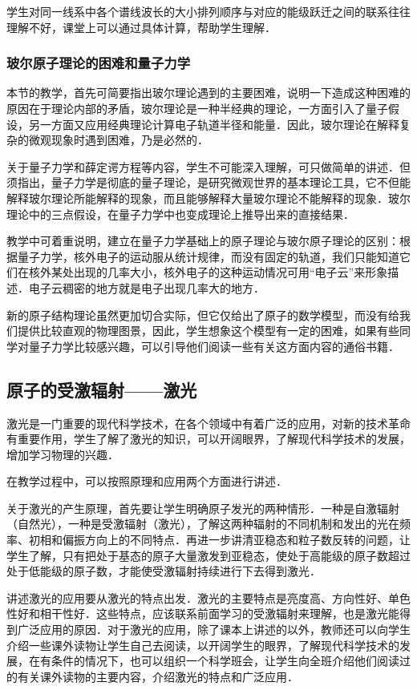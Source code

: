 学生对同一线系中各个谱线波长的大小排列顺序与对应的能级跃迁之间的联系往往理解不好，课堂上可以通过具体计算，帮助学生理解．

\subsubsection{玻尔原子理论的困难和量子力学}

本节的教学，首先可简要指出玻尔理论遇到的主要困难，说明一下造成这种困难的原因在于理论内部的矛盾，玻尔理论是一种半经典的理论，一方面引入了量子假设，另一方面又应用经典理论计算电子轨道半径和能量．因此，玻尔理论在解释复杂的微观现象时遇到困难，乃是必然的．

关于量子力学和薛定谔方程等内容，学生不可能深入理解，可只做简单的讲述．但须指出，量子力学是彻底的量子理论，是研究微观世界的基本理论工具，它不但能解释玻尔理论所能解释的现象，而且能够解释大量玻尔理论不能解释的现象．玻尔理论中的三点假设，在量子力学中也变成理论上推导出来的直接结果．

教学中可着重说明，建立在量子力学基础上的原子理论与玻尔原子理论的区别：根据量子力学，核外电子的运动服从统计规律，而没有固定的轨道，我们只能知道它们在核外某处出现的几率大小，核外电子的这种运动情况可用“电子云”来形象描述．电子云稠密的地方就是电子出现几率大的地方．

新的原子结构理论虽然更加切合实际，但它仅给出了原子的数学模型，而没有给我们提供比较直观的物理图景，因此，学生想象这个模型有一定的困难，如果有些同学对量子力学比较感兴趣，可以引导他们阅读一些有关这方面内容的通俗书籍．

\subsection{原子的受激辐射——激光}

激光是一门重要的现代科学技术，在各个领域中有着广泛的应用，对新的技术革命有重要作用，学生了解了激光的知识，可以开阔眼界，了解现代科学技术的发展，增加学习物理的兴趣．

在教学过程中，可以按照原理和应用两个方面进行讲述．

关于激光的产生原理，首先要让学生明确原子发光的两种情形．一种是自激辐射（自然光），一种是受激辐射（激光），了解这两种辐射的不同机制和发出的光在频率、初相和偏振方向上的不同特点．再进一步讲清亚稳态和粒子数反转的问题，让学生了解，只有把处于基态的原子大量激发到亚稳态，使处于高能级的原子数超过处于低能级的原子数，才能使受激辐射持续进行下去得到激光．

讲述激光的应用要从激光的特点出发．激光的主要特点是亮度高、方向性好、单色性好和相干性好．这些特点，应该联系前面学习的受激辐射来理解，也是激光能得到广泛应用的原因．对于激光的应用，除了课本上讲述的以外，教师还可以向学生介绍一些课外读物让学生自己去阅读，以开阔学生的眼界，了解现代科学技术的发展，在有条件的情况下，也可以组织一个科学班会，让学生向全班介绍他们阅读过的有关课外读物的主要内容，介绍激光的特点和广泛应用．

